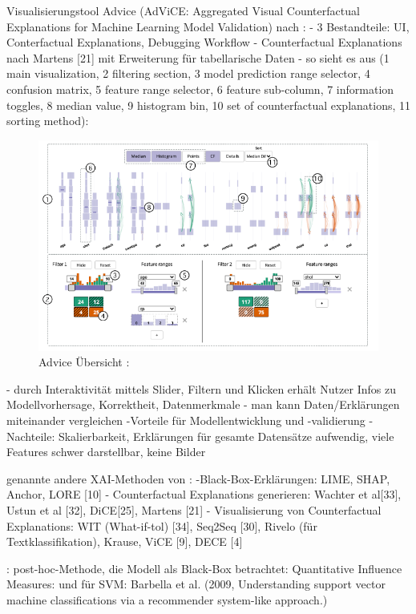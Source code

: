 Visualisierungstool Advice (AdViCE: Aggregated Visual Counterfactual Explanations for Machine Learning Model Validation) nach \cite{gomez2021advice}:
- 3 Bestandteile: UI, Conterfactual Explanations, Debugging Workflow
- Counterfactual Explanations nach Martens [21] mit Erweiterung für tabellarische Daten
- so sieht es aus (1 main visualization,  2 filtering section,  3 model prediction range selector, 4 confusion matrix,  5 feature range selector,  6 feature sub-column,  7 information toggles,  8 median value,  9 histogram bin,  10 set of counterfactual explanations,  11 sorting method):
\begin{figure}
    \centering
    \includegraphics[scale=0.45]{pic/MA-Bilder/Literaturrecherche/29-UI.PNG}
    \caption{Advice Übersicht : \cite{gomez2021advice}}
    \label{Fig:Advice}
\end{figure}
- durch Interaktivität mittels Slider, Filtern und Klicken erhält Nutzer Infos zu Modellvorhersage, Korrektheit, Datenmerkmale
- man kann Daten/Erklärungen miteinander vergleichen
-Vorteile für Modellentwicklung und -validierung 
- Nachteile: Skalierbarkeit, Erklärungen für gesamte Datensätze aufwendig, viele Features schwer darstellbar, keine Bilder

genannte andere XAI-Methoden von \cite{gomez2021advice}:
-Black-Box-Erklärungen: LIME, SHAP, Anchor, LORE [10]
- Counterfactual Explanations generieren: Wachter et al[33], Ustun et al [32], DiCE[25], Martens [21]
- Visualisierung von Counterfactual Explanations: WIT (What-if-tol) [34], Seq2Seq [30], Rivelo (für Textklassifikation), Krause, ViCE [9], DECE [4]

\cite{de2018algorithmic}: post-hoc-Methode, die Modell als Black-Box betrachtet: Quantitative Influence Measures: \cite{datta2016algorithmic} und für SVM: Barbella et al. (2009, Understanding support vector machine classifications via a recommender system-like approach.)

